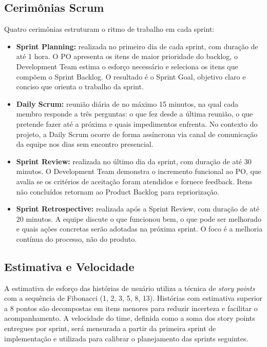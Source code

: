 \documentclass[12pt, a4paper]{article}
\begin{document}
\subsection{Cerimônias Scrum}

Quatro cerimônias estruturam o ritmo de trabalho em cada sprint:

\begin{itemize}
  \item \textbf{Sprint Planning:} realizada no primeiro dia de cada sprint, com duração de até 1 hora. O PO apresenta os itens de maior prioridade do backlog, o Development Team estima o esforço necessário e seleciona os itens que compõem o Sprint Backlog. O resultado é o Sprint Goal, objetivo claro e conciso que orienta o trabalho da sprint.
  \item \textbf{Daily Scrum:} reunião diária de no máximo 15 minutos, na qual cada membro responde a três perguntas: o que fez desde a última reunião, o que pretende fazer até a próxima e quais impedimentos enfrenta. No contexto do projeto, a Daily Scrum ocorre de forma assíncrona via canal de comunicação da equipe nos dias sem encontro presencial.
  \item \textbf{Sprint Review:} realizada no último dia da sprint, com duração de até 30 minutos. O Development Team demonstra o incremento funcional ao PO, que avalia se os critérios de aceitação foram atendidos e fornece feedback. Itens não concluídos retornam ao Product Backlog para repriorização.
  \item \textbf{Sprint Retrospective:} realizada após a Sprint Review, com duração de até 20 minutos. A equipe discute o que funcionou bem, o que pode ser melhorado e quais ações concretas serão adotadas na próxima sprint. O foco é a melhoria contínua do processo, não do produto.
\end{itemize}

\subsection{Estimativa e Velocidade}

A estimativa de esforço das histórias de usuário utiliza a técnica de \textit{story points} com a sequência de Fibonacci (1, 2, 3, 5, 8, 13). Histórias com estimativa superior a 8 pontos são decompostas em itens menores para reduzir incerteza e facilitar o acompanhamento. A velocidade do time, definida como a soma dos story points entregues por sprint, será mensurada a partir da primeira sprint de implementação e utilizada para calibrar o planejamento das sprints seguintes.
\end{document}
